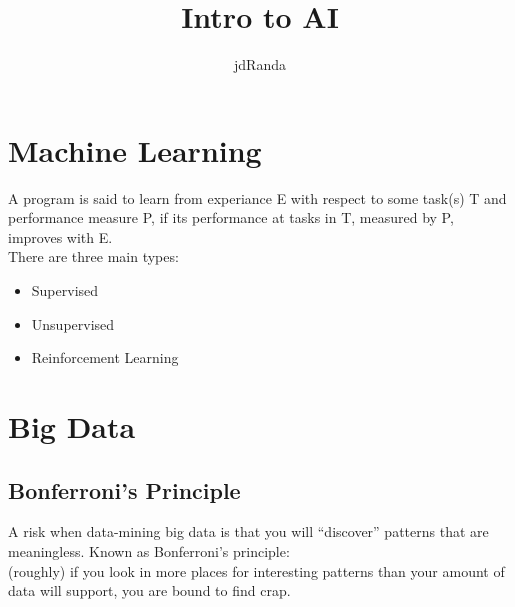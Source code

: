 \documentclass[a4paper, 12pt, twoside]{article}
\author{jdRanda}
\title{Intro to AI}
\begin{document}
    \maketitle
    \newpage

    \section{Machine Learning}
        A program is said to learn from experiance E with respect to some task(s) T and
        performance measure P, if its performance at tasks in T, measured by P, improves
        with E.\\
        There are three main types:

        \begin{itemize}
            \item Supervised
            \item Unsupervised
            \item Reinforcement Learning
        \end{itemize}

    \section{Big Data}

        \subsection{Bonferroni's Principle}
        A risk when data-mining big data is that you will “discover” patterns that are meaningless. Known as Bonferroni’s principle:\\
        (roughly) if you look in more places for interesting patterns than your amount of data will support, you are bound to find crap.
\end{document}
